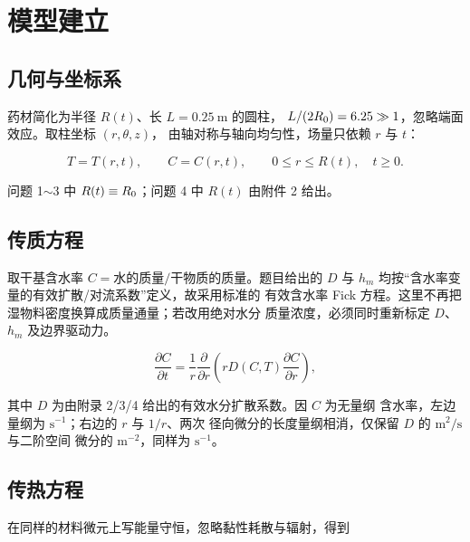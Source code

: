 \section{模型建立}

\subsection{几何与坐标系}

药材简化为半径 $R(t)$、长 $L=0.25\ \mathrm{m}$ 的圆柱，
$L/(2R_{0})=6.25\gg1$，忽略端面效应。取柱坐标 $(r,\theta,z)$，
由轴对称与轴向均匀性，场量只依赖 $r$ 与 $t$：

\begin{equation}
T=T(r,t),\qquad C=C(r,t),\qquad 0\le r\le R(t),\quad t\ge0 .
\end{equation}

问题 1$\sim$3 中 $R(t)\equiv R_{0}$；问题 4 中 $R(t)$ 由附件 2 给出。

\subsection{传质方程}

取干基含水率 $C=\text{水的质量}/\text{干物质的质量}$。题目给出的
$D$ 与 $h_m$ 均按“含水率变量的有效扩散/对流系数”定义，故采用标准的
有效含水率 Fick 方程。这里不再把湿物料密度换算成质量通量；若改用绝对水分
质量浓度，必须同时重新标定 $D$、$h_m$ 及边界驱动力。

\begin{equation}
\frac{\partial C}{\partial t}
=\frac{1}{r}\frac{\partial}{\partial r}\left(rD(C,T)\frac{\partial C}{\partial r}\right),
\label{eq:mass}
\end{equation}

其中 $D$ 为由附录 2/3/4 给出的有效水分扩散系数。因 $C$ 为无量纲
含水率，左边量纲为 $\mathrm{s^{-1}}$；右边的 $r$ 与 $1/r$、两次
径向微分的长度量纲相消，仅保留 $D$ 的 $\mathrm{m^2/s}$ 与二阶空间
微分的 $\mathrm{m^{-2}}$，同样为 $\mathrm{s^{-1}}$。

\subsection{传热方程}

在同样的材料微元上写能量守恒，忽略黏性耗散与辐射，得到

